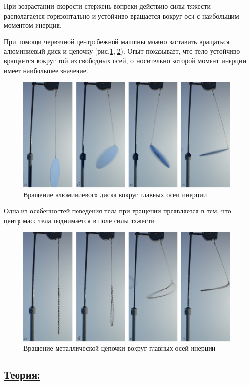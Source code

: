 \documentclass[14pt,a4paper,oneside]{extarticle}	%
\begin{document}
При возрастании скорости стержень вопреки действию силы тяжести располагается горизонтально и устойчиво вращается вокруг оси с наибольшим моментом инерции.

При помощи червячной центробежной машины можно заставить вращаться алюминиевый диск и цепочку (рис.\ref{freeaxis-3}, \ref{freeaxis-4}).
Опыт показывает, что тело устойчиво вращается вокруг той из свободных осей, относительно которой момент инерции имеет наибольшее значение.

\begin{figure}[H] 	
	\centering 		
	\includegraphics[width=0.9\linewidth]{freeaxis-3.png}
	\caption{Вращение алюминиевого диска вокруг главных осей инерции}
	\label{freeaxis-3}
\end{figure}

Одна из особенностей поведения тела при вращении проявляется в том, что центр масс тела поднимается в поле силы тяжести.

\begin{figure}[H]
	\centering 	
	\includegraphics[width=0.9\linewidth]{freeaxis-4.png}
	\caption{Вращение металлической цепочки вокруг главных осей инерции}
	\label{freeaxis-4}
\end{figure}

\newpage
\subsection*{\underline{Теория:}}
\end{document}
